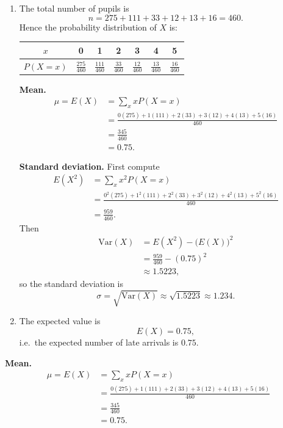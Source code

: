 \documentclass[12pt]{scrartcl}
\begin{document}
\begin{enumerate}[label=\textbf{\arabic*.}]
\begin{enumerate}[label=(\alph*)]
\begin{enumerate}[label=(\alph*)]
\item The total number of pupils is
\[
n = 275+111+33+12+13+16 = 460.
\]
Hence the probability distribution of $X$ is:

\begin{center}
\renewcommand{\arraystretch}{2.0}
\setlength{\tabcolsep}{10pt}
\begin{tabular}{c|cccccc}
$x$ & 0 & 1 & 2 & 3 & 4 & 5 \\
\hline
$P(X=x)$
& $\displaystyle \frac{275}{460}$
& $\displaystyle \frac{111}{460}$
& $\displaystyle \frac{33}{460}$
& $\displaystyle \frac{12}{460}$
& $\displaystyle \frac{13}{460}$
& $\displaystyle \frac{16}{460}$ \\
\end{tabular}
\end{center}


\medskip

\textbf{Mean.}
\begin{align*}
\mu = E(X)
&=\sum_x xP(X=x)\\
&=\frac{0(275)+1(111)+2(33)+3(12)+4(13)+5(16)}{460}\\
&=\frac{345}{460}\\
&=0.75.
\end{align*}

\medskip

\textbf{Standard deviation.}
First compute
\begin{align*}
E(X^2)
&=\sum_x x^2P(X=x)\\
&=\frac{0^2(275)+1^2(111)+2^2(33)+3^2(12)+4^2(13)+5^2(16)}{460}\\
&=\frac{959}{460}.
\end{align*}
Then
\begin{align*}
\mathrm{Var}(X)
&=E(X^2)-\big(E(X)\big)^2\\
&=\frac{959}{460}-(0.75)^2\\
&\approx 1.5223,
\end{align*}
so the standard deviation is
\[
\sigma=\sqrt{\mathrm{Var}(X)}\approx \sqrt{1.5223}\approx 1.234.
\]

\item The expected value is
\[
E(X)=0.75,
\]
i.e.\ the expected number of late arrivals is $0.75$.
\end{enumerate}

\medskip

\textbf{Mean.}
\begin{align*}
\mu = E(X)
&=\sum_x xP(X=x)\\
&=\frac{0(275)+1(111)+2(33)+3(12)+4(13)+5(16)}{460}\\
&=\frac{345}{460}\\
&=0.75.
\end{align*}


\end{enumerate}
\end{enumerate}
\end{document}
